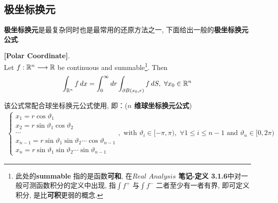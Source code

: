 \newpage

\subsection{极坐标换元}
	\textbf{极坐标换元}是最复杂同时也是最常用的还原方法之一, 下面给出一般的\textbf{极坐标换元公式}.
	\begin{thm}\label{thm 1.6.4}
		\textbf{[Polar Coordinate]}. \\
		Let $f : \mathbb{R}^n \longrightarrow \mathbb{R}$ be continuous and summable\footnote{此处的\textbf{summable} 指的是函数\textbf{可和}, 在\textbf{$Real \,\, Analysis$ 笔记-定义 3.1.6}中对一般可测函数积分的定义中出现, 指$\int f^+$ 与$\int f^-$ 二者至少有一者有界, 即可定义积分, 是比\textbf{可积}更弱的概念.}. Then
		\begin{align}
			\int_{\mathbb{R}^n} f \, dx = \int_{0}^{\infty} dr \int_{\partial B(x_0 , r)} f \, dS , \,\, \forall x_0 \in \mathbb{R}^n
		\end{align}
		
		\vspace{4em}
		
		\begin{rmk}
			该公式常配合球坐标换元公式使用, 即：(\textbf{$n$ 维球坐标换元公式})
			\begin{align}
				\begin{cases}
					x_1 = r \cos{\vartheta_1} \\
					x_2 = r \sin{\vartheta_1} \cos{\vartheta_2} \\
					\cdots \\
					x_{n - 1} = r \sin{\vartheta_1} \sin{\vartheta_2} \cdots \cos{\vartheta_{n - 1}} \\
					x_n = r \sin{\vartheta_1} \sin{\vartheta_2} \cdots \sin{\vartheta_{n - 1}}
				\end{cases} , 
			\,\, \text{with} \,\, 
			\vartheta_i \in [-\pi , \pi) , \,\, \forall 1 \leq i \leq n - 1 
			\,\, \text{and} \,\, 
			\vartheta_n \in [0 , 2\pi)
			\end{align}
		\end{rmk}
	\end{thm}
		
	



	\ifx\allfiles\undefined

\fi
